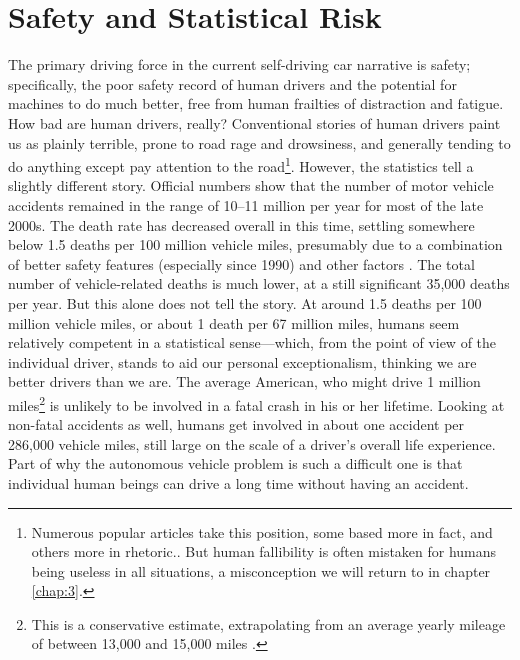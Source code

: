 \section{Safety and Statistical Risk}



The primary driving force in the current self-driving car
narrative is safety; specifically, the poor safety record of human
drivers and the potential for machines to do much better, free from
human frailties of distraction and fatigue. How bad are human
drivers, really? Conventional stories of human drivers paint us as
plainly terrible, prone to road rage and drowsiness, and generally tending
to do anything except pay attention to the road\footnote{Numerous popular
  articles take this position, some based more in fact, and others
  more in rhetoric..
  But human fallibility is often mistaken for humans being useless in
  all situations, a misconception we will return to in chapter
  \ref{chap:3}.}. However, the statistics tell
a slightly different story. Official numbers show that the number of
motor vehicle accidents remained in the range of 10--11 million
per year for most of the late 2000s. The death rate has
decreased overall in this time, settling somewhere below 1.5 deaths
per 100 million vehicle miles, presumably due to a combination of
better safety features (especially since 1990) and other
factors \cite{censusDeaths}. The total number of vehicle-related deaths is much
lower, at a still significant 35,000 deaths per year. But this alone
does not tell the story. At around 1.5 deaths per 100 million vehicle
miles, or about 1 death per 67 million miles, humans seem relatively
competent in a statistical sense---which, from the point of view of
the individual driver, stands to aid our personal exceptionalism,
thinking we are better drivers than we are. The average American, who might
drive 1 million miles\footnote{This is a conservative estimate,
  extrapolating from an average yearly mileage of between 13,000 and
  15,000 miles \cite{fhwa}.} is unlikely to be
involved in a fatal crash in his or her lifetime. Looking at non-fatal
accidents as well, humans get involved in about one accident per
286,000 vehicle miles, still large on the scale of a driver's overall
life experience. Part of why the autonomous vehicle problem is
such a difficult one is that individual human beings can drive a long
time without having an accident.

